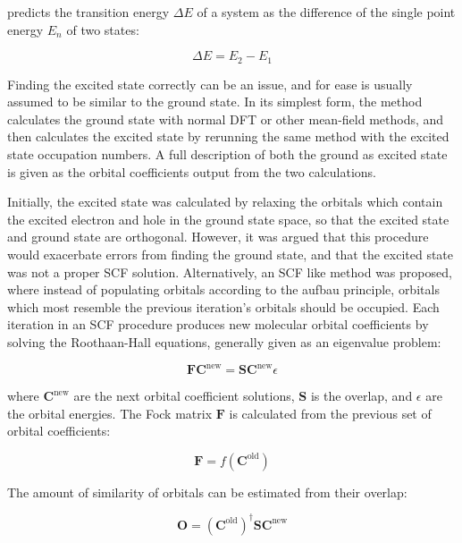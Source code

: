 \dscf predicts the transition energy $\Delta E$ of a system as the difference of
the single point energy $E_n$ of two states:

\begin{equation}
\Delta E = E_{2} - E_{1}
\end{equation}

Finding the excited state correctly can be an issue, and for ease is usually assumed
to be similar to the ground state. In its simplest form, the \dscf method calculates
the ground state with normal DFT or other mean-field methods, and
then calculates the excited state by rerunning the same method with the excited
state occupation numbers. A full description of both the ground as excited state
is given as the orbital coefficients output from the two calculations.

Initially, the excited state was calculated by relaxing the orbitals which
contain the excited electron and hole in the ground state space, so that the
excited state and ground state are orthogonal\cite{Hunt1969}. However, it was
argued that this procedure would exacerbate errors from finding the ground
state, and that the excited state was not a proper SCF solution\cite{Gilbert2008}.
Alternatively, an SCF like method was proposed, where instead of
populating orbitals according to the aufbau principle, orbitals which most
resemble the previous iteration's orbitals should be occupied. Each iteration 
in an SCF procedure produces new molecular orbital coefficients by solving the 
Roothaan-Hall equations\cite{Roothaan1951}, generally given as an eigenvalue problem:

\begin{equation}
\mathbf{F} \mathbf{C}^{\text{new}} = \mathbf{S} \mathbf{C}^{\text{new}} \epsilon
\end{equation}

where $\mathbf{C}^{\text{new}}$ are the next orbital coefficient solutions, 
$\mathbf{S}$ is the overlap, and $\epsilon$ are the orbital energies. 
The Fock matrix $\mathbf{F}$ is calculated from the previous set of orbital 
coefficients:

\begin{equation}
\mathbf{F} = f\left(\mathbf{C}^{\text{old}}\right)
\end{equation}

The amount of similarity of orbitals can be estimated from their overlap:

\begin{equation}
\mathbf{O} = \left(\mathbf{C}^{\text{old}}\right)^\dagger \mathbf{S} \mathbf{C}^{\text{new}}
\end{equation}

